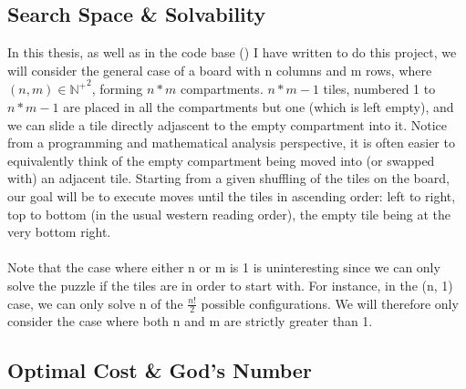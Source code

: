 \subsection{Search Space \& Solvability}

In this thesis, as well as in the code base (\cite{FB}) I have written to do this project, we will consider the general case of a board with n columns and m rows, where $(n, m) \in {\mathbb{N}^{+}}^{2}$, forming $n * m$ compartments. $n * m - 1$ tiles, numbered 1 to $n * m - 1$ are placed in all the compartments but one (which is left empty), and we can slide a tile directly adjascent to the empty compartment into it. Notice from a programming and mathematical analysis perspective, it is often easier to equivalently think of the empty compartment being moved into (or swapped with) an adjacent tile. Starting from a given shuffling of the tiles on the board, our goal will be to execute moves until the tiles in ascending order: left to right, top to bottom (in the usual western reading order), the empty tile being at the very bottom right.
\\
\\
Note that the case where either n or m is 1 is uninteresting since we can only solve the puzzle if the tiles are in order to start with. For instance, in the (n, 1) case, we can only solve n of the $\frac{n!}{2}$ possible configurations. We will therefore only consider the case where both n and m are strictly greater than 1.




\subsection{Optimal Cost \& God's Number}

